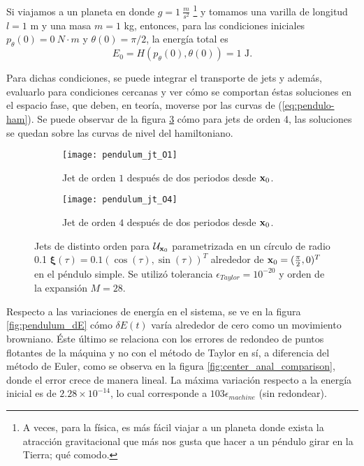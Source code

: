 Si viajamos a un planeta en donde $g = 1 \ \frac{m}{s^2}$ \footnote{A veces, para la física, es más fácil viajar a un planeta donde exista la atracción gravitacional que más nos gusta que hacer a un péndulo girar en la Tierra; qué comodo.} y tomamos una varilla de longitud $l=1$ m y una masa $m=1$ kg,  entonces, para las condiciones iniciales $p_{\theta}(0) = 0 \ N \cdot m$ y $\theta(0) = \pi/2$, la energía total es 
\begin{equation*}
E_0 = H(p_{\theta}(0),\theta (0) ) = 1 \text{ J.}
\end{equation*}

Para dichas condiciones, se puede integrar el transporte de jets y además, evaluarlo para condiciones cercanas y ver cómo se comportan éstas soluciones en el espacio fase, que deben, en teoría, moverse por las curvas de (\ref{eq:pendulo-ham}). Se puede observar de la figura \ref{fig:pendulum_jt} cómo para jets de orden 4, las soluciones se quedan sobre las curvas de nivel del hamiltoniano.

\begin{figure}[h!]
\centering
\begin{subfigure}{0.49\textwidth}
	\centering
	\texttt{[image: pendulum\_jt\_O1]}
	\caption{Jet de orden $1$ después de dos periodos desde $\mathbf{x}_0$.}
	\label{fig:pendulum_jt_O1}
\end{subfigure}
%
\begin{subfigure}{0.49\textwidth}
	\centering
	\texttt{[image: pendulum\_jt\_O4]}
	\caption{Jet de orden $4$ después de dos periodos desde $\mathbf{x}_0$.}
	\label{fig:pendulum_jt_O4}
\end{subfigure}
\caption{Jets de distinto orden para $\mathcal{U}_{\mathbf{x}_0}$ parametrizada en un círculo de radio 0.1 $\mathbf{\xi}(\tau) = 0.1\left( \cos(\tau),\sin(\tau) \right)^T$ alrededor de $\mathbf{x}_0 = (\frac{\pi}{2},0)^T$ en el péndulo simple. Se utilizó tolerancia $\epsilon_{Taylor} = 10^{-20}$ y orden de la expansión $M = 28$.}
\label{fig:pendulum_jt}
\end{figure}

Respecto a las variaciones de energía en el sistema, se ve en la figura \ref{fig:pendulum_dE} cómo $\delta E(t)$ varía alrededor de cero como un movimiento browniano. Éste último se relaciona con los errores de redondeo de puntos flotantes de la máquina y no con el método de Taylor en sí, a diferencia del método de Euler, como se observa en la figura \ref{fig:center_anal_comparison}, donde el error crece de manera lineal. La máxima variación respecto a la energía inicial es de $2.28\times10^{-14}$, lo cual corresponde a $103 \epsilon_{machine}$ (sin redondear).

